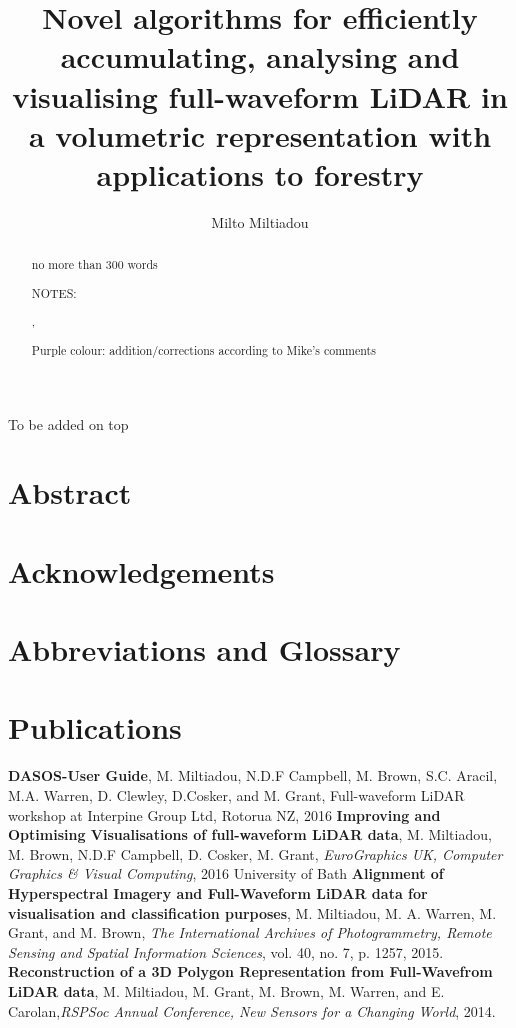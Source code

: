 \documentclass[11pt,nofootinbib]{report}
\title{ Novel algorithms for efficiently accumulating, analysing and visualising full-waveform LiDAR in a volumetric representation with applications to forestry}
\author{Milto Miltiadou}
\begin{document}
	\maketitle
 		
\begin{abstract}	
     no more than 300 words
     
     NOTES:
     \par {\color{blue}{Blue colour: additions according to Neill's feedback}},
     \par {\color{Fuchsia} Purple colour: addition/corrections according to Mike's comments }
     \par {\color{red}{Red colour: notes}}
     \par {\color{gray}{Gray colour: text that is going to be modified }}
     
     \thispagestyle{empty}
\end{abstract}

\newpage
\thispagestyle{empty}
	\setcounter{secnumdepth}{0}
	To be added on top
	\section{Abstract}\label{Abstract}
		
		\thispagestyle{empty}
		\newpage
	\section{Acknowledgements}\label{Acknowledgments}
		
		\thispagestyle{empty}
		\newpage
	

	\section {Abbreviations and Glossary}\label{Abbreviations}
	
	\newpage
	\section{Publications}
		\textbf{DASOS-User Guide}, M. Miltiadou, N.D.F Campbell, M. Brown, S.C. Aracil, M.A. Warren, D. Clewley, D.Cosker, and M. Grant, Full-waveform LiDAR workshop at Interpine Group Ltd, Rotorua NZ, 2016\newline
		\textbf{Improving and Optimising Visualisations of full-waveform LiDAR data}, M. Miltiadou, M. Brown, N.D.F Campbell,  D. Cosker, M. Grant, \textit{EuroGraphics UK, Computer Graphics \& Visual Computing}, 2016 \newline
		University of Bath
		\textbf{Alignment of Hyperspectral Imagery and Full-Waveform LiDAR data for visualisation and classification purposes}, M. Miltiadou, M. A. Warren, M. Grant, and M. Brown, \textit{The International Archives of Photogrammetry, Remote Sensing and Spatial Information Sciences}, vol. 40, no. 7, p. 1257, 2015.\newline
		\textbf{Reconstruction of a 3D Polygon Representation from Full-Wavefrom LiDAR data}, M. Miltiadou, M. Grant, M. Brown, M. Warren, and E. Carolan,\textit{RSPSoc Annual Conference, New Sensors for a Changing World}, 2014.\newline
	 
\end{document}
